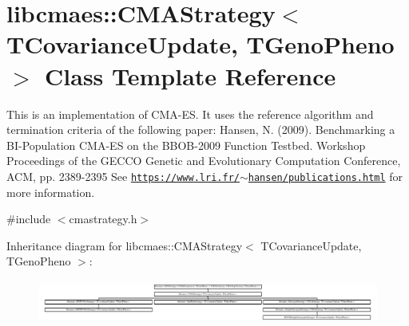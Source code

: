\hypertarget{classlibcmaes_1_1CMAStrategy}{\section{libcmaes\+:\+:C\+M\+A\+Strategy$<$ T\+Covariance\+Update, T\+Geno\+Pheno $>$ Class Template Reference}
\label{classlibcmaes_1_1CMAStrategy}
}


This is an implementation of C\+M\+A-\/\+E\+S. It uses the reference algorithm and termination criteria of the following paper\+: Hansen, N. (2009). Benchmarking a B\+I-\/\+Population C\+M\+A-\/\+E\+S on the B\+B\+O\+B-\/2009 Function Testbed. Workshop Proceedings of the G\+E\+C\+C\+O Genetic and Evolutionary Computation Conference, A\+C\+M, pp. 2389-\/2395 See \href{https://www.lri.fr/~hansen/publications.html}{\tt https\+://www.\+lri.\+fr/$\sim$hansen/publications.\+html} for more information.  




{\ttfamily \#include $<$cmastrategy.\+h$>$}

Inheritance diagram for libcmaes\+:\+:C\+M\+A\+Strategy$<$ T\+Covariance\+Update, T\+Geno\+Pheno $>$\+:\begin{figure}[H]
\begin{center}
\leavevmode
\includegraphics[height=1.429301cm]{classlibcmaes_1_1CMAStrategy}
\end{center}
\end{figure}
